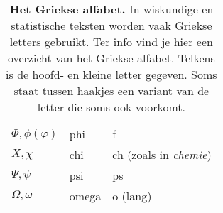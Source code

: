 \begin{table}
\begin{tabular}{lll}
  	$\Phi, \phi (\varphi)$       & phi           & f                           \\
  	$X, \chi$                    & chi           & ch (zoals in \emph{chemie}) \\
  	$\Psi, \psi$                 & psi           & ps                          \\
  	$\Omega, \omega$             & omega         & o (lang)                    \\
  	\bottomrule
  \end{tabular}
  \caption[Het Griekse alfabet]{\textbf{Het Griekse alfabet.} In wiskundige en statistische teksten worden vaak Griekse letters gebruikt. Ter info vind je hier een overzicht van het Griekse alfabet. Telkens is de hoofd- en kleine letter gegeven. Soms staat tussen haakjes een variant van de letter die soms ook voorkomt.}
  \label{tab:griekse-alfabet}
\end{table}